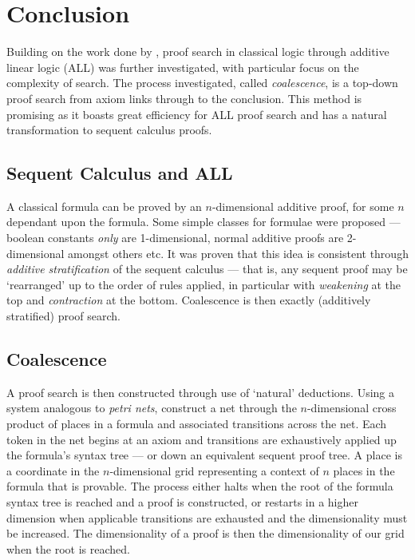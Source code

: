 \chapter{Conclusion}
    
    Building on the work done by \citet{petri-nets}, proof search in classical logic through additive linear logic (ALL) was further investigated, with particular focus on the complexity of search.
    The process investigated, called \textit{coalescence}, is a top-down proof search from axiom links through to the conclusion.
    This method is promising as it boasts great efficiency for ALL proof search and has a natural transformation to sequent calculus proofs.

    \section*{Sequent Calculus and ALL}
        A classical formula can be proved by an $n$-dimensional additive proof, for some $n$ dependant upon the formula.
        Some simple classes for formulae were proposed --- boolean constants \textit{only} are 1-dimensional, normal additive proofs are 2-dimensional amongst others etc.
        It was proven that this idea is consistent through \textit{additive stratification} of the sequent calculus --- that is, any sequent proof may be `rearranged' up to the order of rules applied, in particular with \textit{weakening} at the top and \textit{contraction} at the bottom.
        Coalescence is then exactly (additively stratified) proof search.

    \section*{Coalescence}
        A proof search is then constructed through use of `natural' deductions.
        Using a system analogous to \textit{petri nets}, construct a net through the $n$-dimensional cross product of places in a formula and associated transitions across the net.
        Each token in the net begins at an axiom and transitions are exhaustively applied up the formula's syntax tree --- or down an equivalent sequent proof tree.
        A place is a coordinate in the $n$-dimensional grid representing a context of $n$ places in the formula that is provable.
        The process either halts when the root of the formula syntax tree is reached and a proof is constructed, or restarts in a higher dimension when applicable transitions are exhausted and the dimensionality must be increased.
        The dimensionality of a proof is then the dimensionality of our grid when the root is reached.

